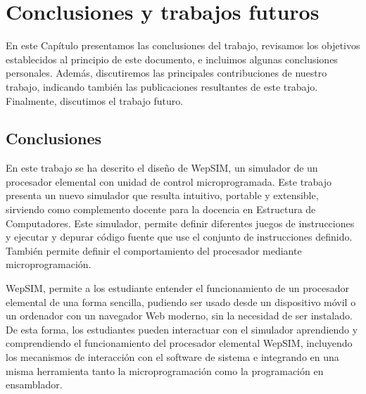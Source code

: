 \chead[]{}
\renewcommand{\headrulewidth}{0.5pt}

\lfoot[]{}
\cfoot[]{}
\rfoot[]{}
\renewcommand{\footrulewidth}{0pt}

\chapter{Conclusiones y trabajos futuros}
\label{ch:conclusions_and_future_work}

En este Capítulo presentamos las conclusiones del trabajo, revisamos los objetivos establecidos al principio de este documento, e incluimos algunas conclusiones personales. Además, discutiremos las principales contribuciones de nuestro trabajo, indicando también las publicaciones resultantes de este trabajo. Finalmente, discutimos el trabajo futuro.

\section{Conclusiones}

En este trabajo se ha descrito el diseño de WepSIM, un simulador de un procesador elemental con unidad de control microprogramada. Este trabajo presenta un nuevo simulador que resulta intuitivo, portable y extensible, sirviendo como complemento docente para la docencia en Estructura de Computadores. Este simulador, permite definir diferentes juegos de instrucciones y ejecutar y depurar código fuente que use el conjunto de instrucciones definido. También permite definir el comportamiento del procesador mediante microprogramación.

WepSIM, permite a los estudiante entender el funcionamiento de un procesador elemental de una forma sencilla, pudiendo ser usado desde un dispositivo móvil o un ordenador con un navegador Web moderno, sin la necesidad de ser instalado. De esta forma, los estudiantes pueden interactuar con el simulador aprendiendo y comprendiendo el funcionamiento del procesador elemental WepSIM, incluyendo los mecanismos de interacción con el software de sistema e integrando en una misma herramienta tanto la microprogramación como la programación en ensamblador.

